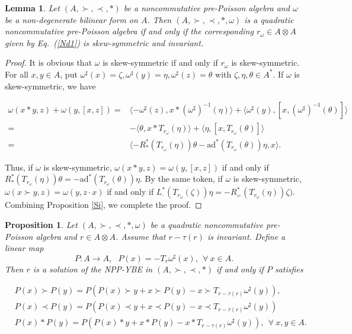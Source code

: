 \documentclass[12pt]{amsart}
\newtheorem{lem}[thm]{Lemma}
\newtheorem{pro}[thm]{Proposition}
\theoremstyle{definition}
\begin{document}
\begin{lem}\label{Fb1} Let $(A,\succ,\prec,\ast)$ be a noncommutative pre-Poisson algebra
 and $\omega$ be a non-degenerate bilinear form on $A$. Then
$(A, \succ,\prec,\ast,\omega)$ is a quadratic noncommutative pre-Poisson algebra if and only if the corresponding $r_{\omega}\in A\otimes A$ given by
Eq.~(\ref{Nd1}) is skew-symmetric and invariant.\end{lem}
\begin{proof}
It is obvious that $\omega$ is skew-symmetric if and only if $r_{\omega}$ is skew-symmetric. 
For all $x,y\in A$, put $\omega^{\sharp}(x)=\zeta,\omega^{\sharp}(y)=\eta,
\omega^{\sharp}(z)=\theta$ with $\zeta,\eta,\theta\in A^{*}$. If $\omega$ is skew-symmetric, we have
\begin{small}
\begin{align*} \omega (x \ast y, z)+\omega(y, [x, z])
=&\langle -\omega^{\sharp}(z), x\ast(\omega^{\sharp})^{-1}(\eta)\rangle
+\langle \omega^{\sharp}(y), [x, (\omega^{\sharp})^{-1}(\theta)]\rangle
\\=&-\langle \theta, x\ast T_{r_{\omega}}(\eta)\rangle
+\langle \eta, [x, T_{r_{\omega}}(\theta)]\rangle
\\=&\langle -R_{\ast}^{*}(T_{r_{\omega}}(\eta))\theta-\mathrm{ad}^{*}(T_{r_{\omega}}(\theta))\eta, x\rangle.\end{align*}
\end{small}
Thus, if $\omega$ is skew-symmetric, $\omega (x \ast y, z)=\omega(y, [x, z])$ if and only if
$R_{\ast}^{*}(T_{r_{\omega}}(\eta))\theta=-\mathrm{ad}^{*}(T_{r_{\omega}}(\theta))\eta$.
By the same token, if $\omega$ is skew-symmetric, $\omega (x \succ y, z)=\omega(y, z\cdot x)$ if and only if
$ L_{\cdot}^{*} (T_{r_{\omega}}(\zeta))\eta=-R_{\succ}^{*}(T_{r_{\omega}}(\eta))\zeta).$
Combining Proposition \ref{Si}, we complete the proof.
 \end{proof}
 
\begin{pro} \label{QF1} Let $(A, \succ,\prec,\ast,\omega)$ be a quadratic noncommutative pre-Poisson algebra and $r\in A\otimes A$. 
Assume that $r-\tau(r)$ is invariant. Define a linear map 
\begin{equation}\label{Nd2}P:A\longrightarrow A,\ \ \ P(x)=-T_{r}\omega^{\sharp}(x),~~\forall~x\in A.\end{equation}
Then $r$ is a solution of the NPP-YBE in $(A, \succ,\prec,\ast)$ if and only if $P$ satisfies 
\begin{small}
\begin{align}&\label{Nd3}P(x)\succ P(y)= P(P(x)\succ y+x\succ P(y)-x\succ T_{r-\tau(r)}\omega^{\sharp}(y)),\\&
\label{Nd4}P(x)\prec P(y)= P(P(x)\prec y+x\prec P(y)-x\prec T_{r-\tau(r)}\omega^{\sharp}(y))
\\&\label{Nd5}P(x)\ast P(y)= P(P(x)\ast y+x\ast P(y)-x\ast T_{r-\tau(r)}\omega^{\sharp}(y)),~~\forall~x,y\in A.
 \end{align}\end{small}
\end{pro}
\end{document}
